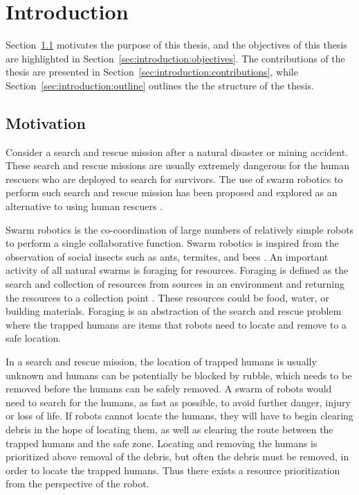 
\chapter{Introduction}
\label{chap:introduction}
\pagestyle{headings}
\setcounter{page}{1}


Section~\ref{sec:introduction:motivation} motivates the purpose of this thesis, and the objectives of this thesis are highlighted in Section~\ref{sec:introduction:objectives}. The contributions of the thesis are presented in Section~\ref{sec:introduction:contributions}, while Section~\ref{sec:introduction:outline} outlines the the structure of the thesis.

\section{Motivation}
\label{sec:introduction:motivation}
Consider a search and rescue mission after a natural disaster or mining accident. These search and rescue missions are usually extremely dangerous for the human rescuers who are deployed to search for survivors. The use of swarm robotics to perform such search and rescue mission has been proposed and explored as an alternative to using human rescuers \cite{murphy2008search,naghsh2008analysis}.

Swarm robotics is the co-coordination of large numbers of  relatively simple robots to perform a single collaborative function. Swarm robotics is inspired from the observation of social insects such as ants, termites, and bees \cite{dorigo2004swarm}. An important activity of all natural swarms is foraging for resources. Foraging is defined as the search and collection of resources from sources in an environment and returning the resources to a collection point \cite{winfield2009foraging}. These resources could be food, water, or building materials. Foraging is an abstraction of the search and rescue problem where the trapped humans are items that robots need to locate and remove to a safe location. 

In a search and rescue mission, the location of trapped humans is usually unknown and humans can be potentially be blocked by rubble, which needs to be removed before the humans can be safely removed. A swarm of robots would need to search for the humans, as fast as possible, to avoid further danger, injury or loss of life. If robots cannot locate the humans, they will have to begin clearing debris in the hope of locating them, as well as clearing the route between the trapped humans and the safe zone. Locating and removing the humans is prioritized above removal of the debris, but often the debris must be removed, in order to locate the trapped humans. Thus there exists a resource prioritization from the perspective of the robot.

